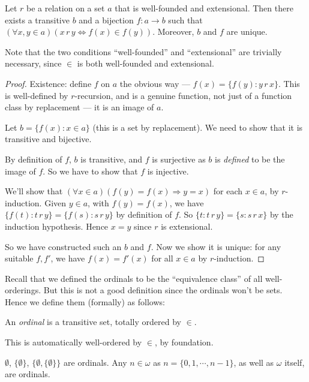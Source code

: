 \documentclass[a4paper]{article}
\begin{document}
\begin{thm}
  Let $r$ be a relation on a set $a$ that is well-founded and extensional. Then there exists a transitive $b$ and a bijection $f: a \to b$ such that $(\forall x, y\in a)(x\, r\, y\Leftrightarrow f(x) \in f(y))$. Moreover, $b$ and $f$ are unique.
\end{thm}
Note that the two conditions ``well-founded'' and ``extensional'' are trivially necessary, since $\in$ is both well-founded and extensional.

\begin{proof}
  Existence: define $f$ on $a$ the obvious way --- $f(x) = \{f(y): y\,r\,x\}$. This is well-defined by $r$-recursion, and is a genuine function, not just of a function class by replacement --- it is an image of $a$.

  Let $b = \{f(x): x\in a\}$ (this is a set by replacement). We need to show that it is transitive and bijective.

  By definition of $f$, $b$ is transitive, and $f$ is surjective as $b$ is \emph{defined} to be the image of $f$. So we have to show that $f$ is injective.

  We'll show that $(\forall x\in a)(f(y) = f(x) \Rightarrow y = x)$ for each $x\in a$, by $r$-induction. Given $y\in a$, with $f(y) = f(x)$, we have $\{f(t): t\,r\, y\} = \{f(s): s\,r\,y\}$ by definition of $f$. So $\{t: t\,r \, y\}=\{s: s\,r \, x\}$ by the induction hypothesis. Hence $x = y$ since $r$ is extensional.

  So we have constructed such an $b$ and $f$. Now we show it is unique: for any suitable $f, f'$, we have $f(x) = f'(x)$ for all $x\in a$ by $r$-induction.
\end{proof}

Recall that we defined the ordinals to be the ``equivalence class'' of all well-orderings. But this is not a good definition since the ordinals won't be sets. Hence we define them (formally) as follows:
\begin{defi}[Ordinal]
  An \emph{ordinal} is a transitive set, totally ordered by $\in$.
\end{defi}
This is automatically well-ordered by $\in$, by foundation.

\begin{eg}
  $\emptyset$, $\{\emptyset\}$, $\{\emptyset, \{\emptyset\}\}$ are ordinals. Any $n\in \omega$ as $n = \{0, 1, \cdots, n - 1\}$, as well as $\omega$ itself, are ordinals.
\end{eg}
\end{document}
